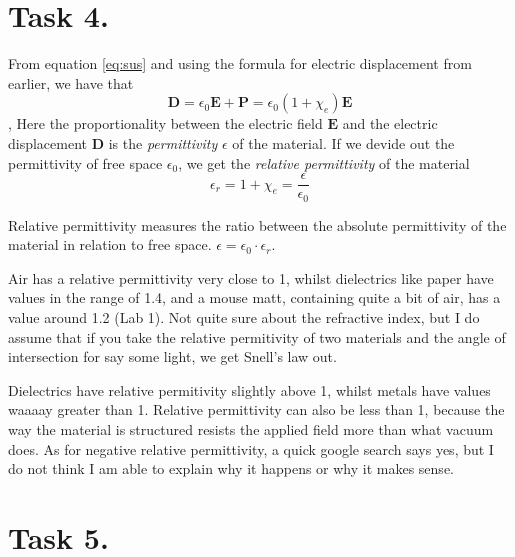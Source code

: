 \documentclass[a4paper,11pt]{article}
\begin{document}
\section*{Task 4.}
\begin{alphalist}
    \item From equation \ref{eq:sus} and using the formula for electric displacement from earlier, we have that
        \[
            \mathbf{D} = \epsilon_0 \mathbf{E} + \mathbf{P} = \epsilon_0(1 + \chi_e) \mathbf{E}
        \],
        Here the proportionality between the electric field $\mathbf{E}$ and the electric displacement $\mathbf{D}$ is the \textit{permittivity} $\epsilon$ of the material. 
        If we devide out the permittivity of free space $\epsilon_0$, we get the \textit{relative permittivity} of the material 
        \[
            \epsilon_r = 1 + \chi_e = \frac{\epsilon}{\epsilon_0}
        \]
    \item Relative permittivity measures the ratio between the absolute permittivity of the material in relation to free space. $\epsilon = \epsilon_0 \cdot \epsilon_r$.
    \item Air has a relative permittivity very close to 1, whilst dielectrics like paper have values in the range of 1.4, and a mouse matt, containing quite a bit of air, has a value 
        around 1.2 (Lab 1). Not quite sure about the refractive index, but I do assume that if you take the relative permitivity of two materials and the angle of intersection for say some light, we 
        get Snell's law out.
    \item Dielectrics have relative permitivity slightly above 1, whilst metals have values waaaay greater than 1. Relative permittivity can also be less than 1, because the way the material is 
        structured resists the applied field more than what vacuum does. As for negative relative permittivity, a quick google search says yes, but I do not think I am able to explain why it happens or why it makes sense.
\end{alphalist}

\section*{Task 5.}
\begin{alphalist}
    \item
        \begin{romanlist}
            \item 
            \item 
        \end{romanlist}
    \item
\end{alphalist}
\end{document}
